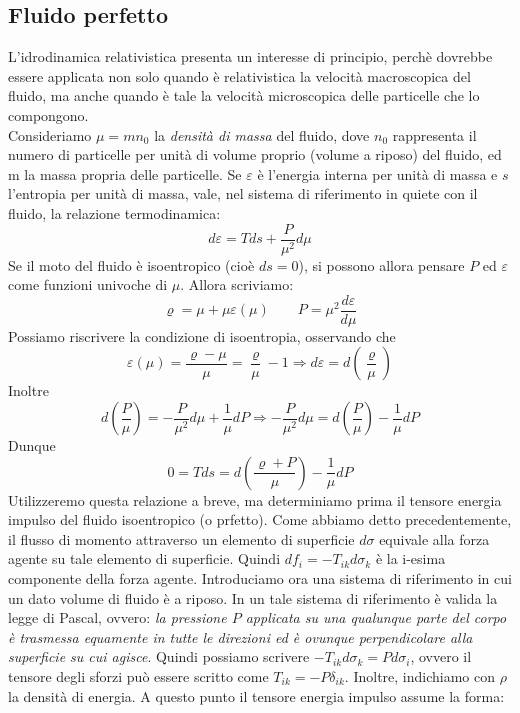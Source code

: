 \documentclass[a4paper,11pt]{book}
\theoremstyle{plain}
\theoremstyle{definition}
\begin{document}
\subsection{Fluido perfetto}
L'idrodinamica relativistica presenta un interesse di principio, perchè dovrebbe essere applicata non solo quando è relativistica la velocità macroscopica del fluido, ma anche quando è tale la velocità microscopica delle particelle che lo compongono.\\
Consideriamo $\mu=mn_0$ la \emph{densità di massa} del fluido, dove $n_0$ rappresenta il numero di particelle per unità di volume proprio (volume a riposo) del fluido, ed m la massa propria delle particelle. Se $\varepsilon$ è l'energia interna per unità di massa e $s$ l'entropia per unità di massa, vale, nel sistema di riferimento in quiete con il fluido, la relazione termodinamica:
\[
d\varepsilon = Tds + \frac{P}{\mu^2}d\mu
\] 
Se il moto del fluido è isoentropico (cioè $ds=0$), si possono allora pensare $P$ ed $\varepsilon$ come funzioni univoche di $\mu$. Allora scriviamo:
\[
\varrho = \mu +\mu\varepsilon(\mu) \qquad P=\mu^2\frac{d\varepsilon}{d\mu}
\]
Possiamo riscrivere la condizione di isoentropia, osservando che
\[
\varepsilon(\mu) = \frac{\varrho-\mu}{\mu} =\frac{\varrho}{\mu}-1 \Longrightarrow d\varepsilon = d\left( \frac{\varrho}{\mu} \right)
\]
Inoltre
\[
d\left( \frac{P}{\mu} \right) = -\frac{P}{\mu^2}d\mu +\frac{1}{\mu}dP \Longrightarrow  -\frac{P}{\mu^2}d\mu = d\left( \frac{P}{\mu} \right) - \frac{1}{\mu}dP
\]
Dunque
\begin{equation}\label{eq:7.9}
0 = Tds = d\left( \frac{\varrho+P}{\mu} \right) - \frac{1}{\mu}dP
\end{equation}
Utilizzeremo questa relazione a breve, ma determiniamo prima il tensore energia impulso del fluido isoentropico (o prfetto). Come abbiamo detto precedentemente, il flusso di momento attraverso un elemento di superficie $d\sigma$ equivale alla forza agente su tale elemento di superficie. Quindi $df_i = -T_{ik}d\sigma_{k}$ è la i-esima componente della forza agente. Introduciamo ora una sistema di riferimento in cui un dato volume di fluido è a riposo. In un tale sistema di riferimento è valida la legge di Pascal, ovvero: \emph{la pressione $P$ applicata su una qualunque parte del corpo è trasmessa equamente in tutte le direzioni ed è ovunque perpendicolare alla superficie su cui agisce}. Quindi possiamo scrivere $-T_{ik}d\sigma_{k} = Pd\sigma_{i}$, ovvero il tensore degli sforzi può essere scritto come $T_{ik} = -P\delta_{ik}$. Inoltre, indichiamo con $\rho$ la densità di energia. A questo punto il tensore energia impulso assume la forma:
\end{document}
